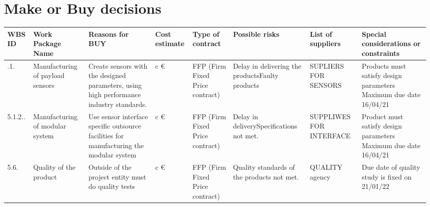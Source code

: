 \section{Make or Buy decisions}

\begin{landscape}
	
	\begin{longtable}[H]{ >{\raggedright\arraybackslash}p{1cm}  >{\raggedright\arraybackslash}p{2.7cm}  >{\raggedright\arraybackslash}p{3.5cm}  >{\raggedright\arraybackslash}p{1.7cm}  >{\raggedright\arraybackslash}p{2cm}  >{\raggedright\arraybackslash}p{2.5cm}  >{\raggedright\arraybackslash}p{2.5cm}  >{\raggedright\arraybackslash}p{4cm}  }
		
		\toprule[2pt]
		
		\textbf{WBS ID} &  \textbf{Work Package Name}  & \textbf{Reasons for BUY} & \textbf{Cost estimate} & \textbf{Type of contract} & \textbf{Possible risks} & \textbf{List of suppliers} & \textbf{Special considerations or constraints} \\
		
		\midrule[1.5pt]
		
		
		
		5.1.1. & Manufacturing of payload sensors & Create sensors with the designed parameters, using high performance industry standards.  & c \euro & FFP (Firm Fixed Price contract) & Delay in delivering the products\newline Faulty products  & SUPLIERS FOR SENSORS & Products must satisfy design parameters \newline Maximum due date 16/04/21  \\
		
		\hline
		
		5.1.2.. & Manufacturing of modular system & Use sensor interface specific outsource facilities for manufacturing the modular system   & c \euro & FFP (Firm Fixed Price contract) & Delay in delivery\newline Specifications not met. & SUPPLIWES FOR INTERFACE & Product must satisfy design parameters \newline Maximum due date 16/04/21 \\
		
		\hline
		
		5.6. & Quality of the product & Outside of the project entity must do  quality tests& c \euro & FFP (Firm Fixed Price contract) & Quality standards of the products not met.& QUALITY agency & Due date of quality study is fixed on 21/01/22\\
		
		
		
		
		\bottomrule[2pt]
	\end{longtable}

\end{landscape}


